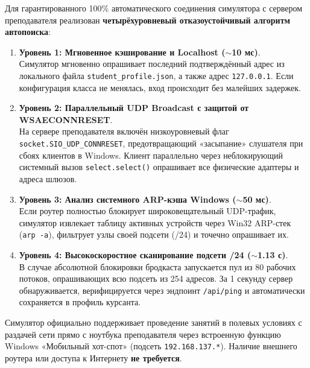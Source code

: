 \documentclass[12pt,a4paper]{report}
\begin{document}
Для гарантированного 100\% автоматического соединения симулятора с сервером преподавателя реализован \textbf{четырёхуровневый отказоустойчивый алгоритм автопоиска}:

\begin{enumerate}
    \item \textbf{Уровень 1: Мгновенное кэширование и Localhost ($\sim$10 мс)}.\\
    Симулятор мгновенно опрашивает последний подтверждённый адрес из локального файла \texttt{student\_profile.json}, а также адрес \texttt{127.0.0.1}. Если конфигурация класса не менялась, вход происходит без малейших задержек.
    \item \textbf{Уровень 2: Параллельный UDP Broadcast с защитой от WSAECONNRESET}.\\
    На сервере преподавателя включён низкоуровневый флаг \texttt{socket.SIO\_UDP\_CONNRESET}, предотвращающий «засыпание» слушателя при сбоях клиентов в Windows. Клиент параллельно через неблокирующий системный вызов \texttt{select.select()} опрашивает все физические адаптеры и адреса шлюзов.
    \item \textbf{Уровень 3: Анализ системного ARP-кэша Windows ($\sim$50 мс)}.\\
    Если роутер полностью блокирует широковещательный UDP-трафик, симулятор извлекает таблицу активных устройств через Win32 ARP-стек (\texttt{arp -a}), фильтрует узлы своей подсети (/24) и точечно опрашивает их.
    \item \textbf{Уровень 4: Высокоскоростное сканирование подсети /24 ($\sim$1.13 с)}.\\
    В случае абсолютной блокировки бродкаста запускается пул из 80 рабочих потоков, опрашивающих всю подсеть из 254 адресов. За 1 секунду сервер обнаруживается, верифицируется через эндпоинт \texttt{/api/ping} и автоматически сохраняется в профиль курсанта.
\end{enumerate}

\begin{tipBox}
    Симулятор официально поддерживает проведение занятий в полевых условиях с раздачей сети прямо с ноутбука преподавателя через встроенную функцию Windows «Мобильный хот-спот» (подсеть \texttt{192.168.137.*}). Наличие внешнего роутера или доступа к Интернету \textbf{не требуется}.
\end{tipBox}

\end{document}

